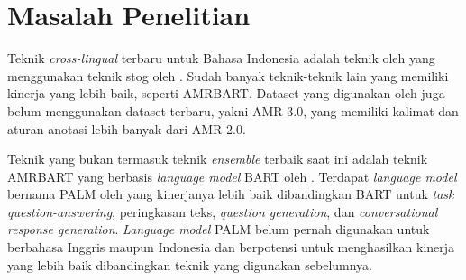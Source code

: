 \section{Masalah Penelitian}

Teknik \textit{cross-lingual} \amrparsing{} terbaru untuk Bahasa Indonesia adalah teknik oleh \textcite{putra2022} yang menggunakan teknik stog oleh .
Sudah banyak teknik-teknik lain yang memiliki kinerja \amrparsing{} yang lebih baik, seperti AMRBART.
Dataset yang digunakan oleh \textcite{putra2022} juga belum menggunakan dataset terbaru, yakni AMR 3.0, yang memiliki kalimat dan aturan anotasi lebih banyak dari AMR 2.0.

Teknik \amrparsing{} yang bukan termasuk teknik \textit{ensemble} terbaik saat ini adalah teknik AMRBART yang berbasis \textit{language model} BART oleh \textcite{lewis2020}. Terdapat \textit{language model} bernama PALM oleh \textcite{bi2020} yang kinerjanya lebih baik dibandingkan BART untuk \textit{task} \textit{question-answering}, peringkasan teks, \textit{question generation}, dan \textit{conversational response generation}.
\textit{Language model} PALM belum pernah digunakan untuk \amrparsing{} berbahasa Inggris maupun Indonesia dan berpotensi untuk menghasilkan kinerja yang lebih baik dibandingkan teknik yang digunakan sebelumnya.


